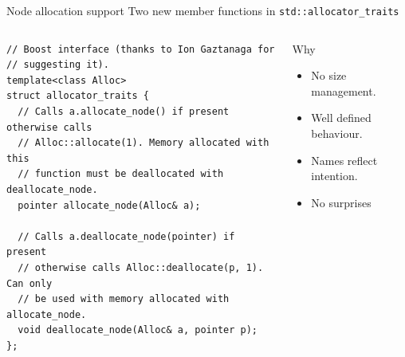 \documentclass[10pt,aspectratio=169]{beamer}
\begin{document}
\begin{frame}[fragile]
{Node allocation support}
{Two new member functions in \texttt{std::allocator\_traits}}

\begin{columns}
\begin{column}{0.60\textwidth}
\begin{lstlisting}
// Boost interface (thanks to Ion Gaztanaga for
// suggesting it).
template<class Alloc>
struct allocator_traits {
  // Calls a.allocate_node() if present otherwise calls
  // Alloc::allocate(1). Memory allocated with this
  // function must be deallocated with deallocate_node.
  pointer allocate_node(Alloc& a);

  // Calls a.deallocate_node(pointer) if present
  // otherwise calls Alloc::deallocate(p, 1). Can only
  // be used with memory allocated with allocate_node.
  void deallocate_node(Alloc& a, pointer p);
};
\end{lstlisting}
\end{column}

\begin{column}{0.40\textwidth}
\begin{block}{Why}
\begin{itemize}
\item No size management.
\item Well defined behaviour.
\item Names reflect intention.
\item {\color{alertc}No surprises}
\end{itemize}
\end{block}
\end{column}

\end{columns}

\end{frame}
\end{document}
